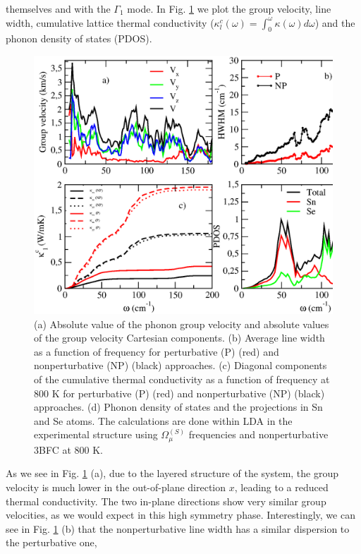 themselves and with the $\Gamma_1$ mode. In Fig. \ref{thermal-analysis} we plot the group velocity, line width, cumulative lattice thermal conductivity
($\kappa_{l}^{c}(\omega)=\int_{0}^{\omega}\kappa(\omega)d\omega$) and the phonon density of states (PDOS).
\begin{figure}[th]
\includegraphics[width=\linewidth]{Figures/thermal_analysis.eps}
	\caption[Thermal propertie of $Cmcm$ SnSe.]{(a) Absolute value of the phonon group velocity and absolute 
	values of the group velocity Cartesian components. (b) Average line width as a function of frequency for 
	perturbative (P) (red) and nonperturbative (NP) (black) approaches. (c) Diagonal components of the 
	cumulative thermal conductivity as a function of frequency at $800$ K for perturbative (P) (red) and 
	nonperturbative (NP) (black) approaches. (d) Phonon density of states and the projections in Sn and Se atoms. 
	The calculations are done within LDA in the experimental structure using
$\Omega^{(S)}_{\mu}$ frequencies and nonperturbative 3BFC at $800$ K.}
\label{thermal-analysis}
\end{figure}
As we see in Fig. \ref{thermal-analysis} (a), due to the layered structure of the system, the group velocity is much
lower in the out-of-plane direction $x$, leading to a reduced thermal conductivity. The two in-plane directions show
very similar group velocities, as we would expect in this high symmetry phase. Interestingly, we can see in
Fig. \ref{thermal-analysis} (b) that the nonperturbative line width has a similar dispersion to the perturbative one,

